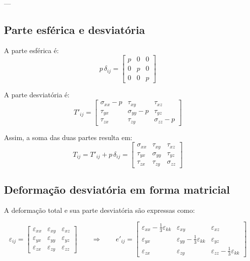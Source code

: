 ---

\subsection*{Parte esférica e desviatória}

A parte esférica é:
\[
p\,\delta_{ij} =
\begin{bmatrix}
p & 0 & 0 \\
0 & p & 0 \\
0 & 0 & p
\end{bmatrix}
\]

A parte desviatória é:
\[
T'_{ij} =
\begin{bmatrix}
\sigma_{xx} - p & \tau_{xy} & \tau_{xz} \\
\tau_{yx} & \sigma_{yy} - p & \tau_{yz} \\
\tau_{zx} & \tau_{zy} & \sigma_{zz} - p
\end{bmatrix}
\]

Assim, a soma das duas partes resulta em:
\[
T_{ij} = T'_{ij} + p\,\delta_{ij} =
\begin{bmatrix}
\sigma_{xx} & \tau_{xy} & \tau_{xz} \\
\tau_{yx} & \sigma_{yy} & \tau_{yz} \\
\tau_{zx} & \tau_{zy} & \sigma_{zz}
\end{bmatrix}
\]

\subsection*{Deformação desviatória em forma matricial}

A deformação total e sua parte desviatória são expressas como:

\[
\varepsilon_{ij} =
\begin{bmatrix}
\varepsilon_{xx} & \varepsilon_{xy} & \varepsilon_{xz} \\
\varepsilon_{yx} & \varepsilon_{yy} & \varepsilon_{yz} \\
\varepsilon_{zx} & \varepsilon_{zy} & \varepsilon_{zz}
\end{bmatrix}
\qquad \Rightarrow \qquad
e'_{ij} =
\begin{bmatrix}
\varepsilon_{xx} - \tfrac{1}{3}\varepsilon_{kk} & \varepsilon_{xy} & \varepsilon_{xz} \\
\varepsilon_{yx} & \varepsilon_{yy} - \tfrac{1}{3}\varepsilon_{kk} & \varepsilon_{yz} \\
\varepsilon_{zx} & \varepsilon_{zy} & \varepsilon_{zz} - \tfrac{1}{3}\varepsilon_{kk}
\end{bmatrix}
\]

